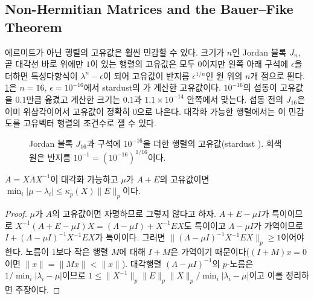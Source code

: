 \subsection{Non-Hermitian Matrices and the Bauer--Fike Theorem}

에르미트가 아닌 행렬의 고유값은 훨씬 민감할 수 있다. 크기가 $n$인 Jordan 블록 $J_n$, 곧 대각선 바로 위에만 $1$이 있는 행렬의 고유값은 모두 $0$이지만 왼쪽 아래 구석에 $\epsilon$을 더하면 특성다항식이 $\lambda^n-\epsilon$이 되어 고유값이 반지름 $\epsilon^{1/n}$인 원 위의 $n$개 점으로 뛴다. \cref{fig:jordan}은 $n=16$, $\epsilon=10^{-16}$에서 stardust의 가 계산한 고유값이다. $10^{-16}$의 섭동이 고유값을 $0.1$만큼 옮겼고 계산한 크기는 $0.1$과 $1.1\times10^{-14}$ 안쪽에서 맞는다. 섭동 전의 $J_{16}$은 이미 위삼각이어서 고유값이 정확히 $0$으로 나온다. 대각화 가능한 행렬에서는 이 민감도를 고유벡터 행렬의 조건수로 잴 수 있다.

\begin{figure}[htbp]
\centering
{}
\caption{Jordan 블록 $J_{16}$과 구석에 $10^{-16}$을 더한 행렬의 고유값(stardust ). 회색 원은 반지름 $10^{-1}=(10^{-16})^{1/16}$이다.}
\label{fig:jordan}
\end{figure}

\begin{theorem}
\label{thm:bauer-fike}
$A=X\Lambda X^{-1}$이 대각화 가능하고 $\mu$가 $A+E$의 고유값이면 $\min_i|\mu-\lambda_i|\le\kappa_p(X)\|E\|_p$이다.
\end{theorem}

\begin{proof}
$\mu$가 $A$의 고유값이면 자명하므로 그렇지 않다고 하자. $A+E-\mu I$가 특이이므로 $X^{-1}(A+E-\mu I)X=(\Lambda-\mu I)+X^{-1}EX$도 특이이고 $\Lambda-\mu I$가 가역이므로 $I+(\Lambda-\mu I)^{-1}X^{-1}EX$가 특이이다. 그러면 $\|(\Lambda-\mu I)^{-1}X^{-1}EX\|_p\ge1$이어야 한다. 노름이 $1$보다 작은 행렬 $M$에 대해 $I+M$은 가역이기 때문이다($(I+M)x=0$이면 $\|x\|=\|Mx\|<\|x\|$). 대각행렬 $(\Lambda-\mu I)^{-1}$의 $p$-노름은 $1/\min_i|\lambda_i-\mu|$이므로 $1\le\|X^{-1}\|_p\|E\|_p\|X\|_p/\min_i|\lambda_i-\mu|$이고 이를 정리하면 주장이다.
\end{proof}

